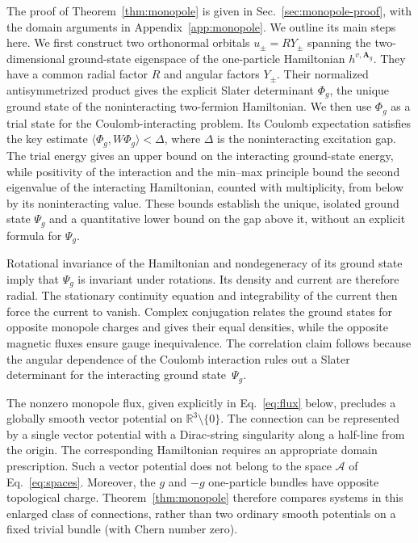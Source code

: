 \documentclass[11pt,a4paper]{article}
\theoremstyle{remark}
\theoremstyle{plain}
\newcommand{\R}{\mathbb R}
\newcommand{\A}{\mathbf A}
\newcommand{\ip}[2]{\langle #1,#2\rangle}
\begin{document}
The proof of Theorem~\ref{thm:monopole} is given in
Sec.~\ref{sec:monopole-proof}, with the domain arguments in
Appendix~\ref{app:monopole}.
We outline its main steps here. 
We first construct two orthonormal orbitals $u_\pm=RY_\pm$
spanning the two-dimensional ground-state eigenspace of
the one-particle Hamiltonian $h^{v,\A_g}$.
They have a common radial factor $R$ and angular factors $Y_\pm$.
Their normalized antisymmetrized product gives the explicit
Slater determinant $\Phi_g$, the unique ground state of the
noninteracting two-fermion Hamiltonian. We then use $\Phi_g$ as a
trial state for the Coulomb-interacting problem. Its Coulomb
expectation satisfies the key
estimate $\ip{\Phi_g}{W\Phi_g}<\Delta$, where $\Delta$ is the noninteracting
excitation gap. The trial energy gives an upper bound on the
interacting ground-state energy,
while positivity of the interaction and the min--max principle
bound the second eigenvalue of the interacting Hamiltonian, counted
with multiplicity, from below by its noninteracting value.
These bounds establish the unique, isolated ground state $\Psi_g$
and a quantitative lower bound on the gap above it, without an explicit formula for $\Psi_g$.

Rotational invariance of the Hamiltonian and nondegeneracy of its
ground state imply that $\Psi_g$ is invariant under rotations.
Its density and current are therefore radial. The stationary continuity equation
and integrability of the current then force the current to vanish.
Complex conjugation relates the ground states for opposite monopole
charges and gives their equal densities, while the opposite magnetic
fluxes ensure gauge inequivalence.
The correlation claim follows because the angular
dependence of the Coulomb interaction rules out a Slater determinant
for the interacting ground state~$\Psi_g$.

The nonzero monopole flux, given explicitly in
Eq.~\eqref{eq:flux} below, precludes a globally smooth vector
potential on $\R^3\setminus\{0\}$. 
The connection can be represented by a single vector potential with a
Dirac-string singularity along a half-line from the origin. The
corresponding Hamiltonian requires an appropriate domain prescription.
Such a vector potential does not belong to the space $\mathcal A$ of
Eq.~\eqref{eq:spaces}. Moreover, the $g$ and $-g$ one-particle bundles
have opposite topological charge. Theorem~\ref{thm:monopole} therefore
compares systems in this enlarged class of connections, rather than
two ordinary smooth potentials on a fixed trivial bundle
(with Chern number zero).
\end{document}
